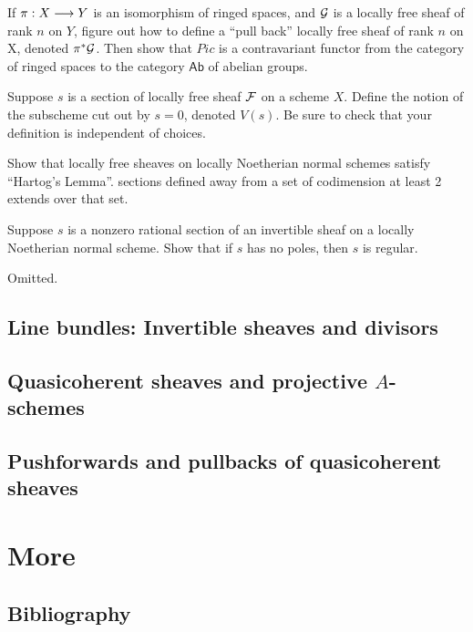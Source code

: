 \documentclass[11pt]{book} %
\begin{document}
\begin{exr}
If $\pi:X\longrightarrow Y$ is an isomorphism of ringed spaces, and ${\cal G}$ is a locally free sheaf of rank $n$ on $Y$, figure out how to define a ``pull back'' locally free sheaf of rank $n$ on X, denoted $\pi^*{\cal G}$. Then show that $Pic$ is a contravariant functor from the category of ringed spaces to the category $\mathsf{Ab}$ of abelian groups.
\end{exr}

\begin{exr}
Suppose $s$ is a section of locally free sheaf ${\cal F}$ on a scheme $X$. Define the notion of the subscheme cut out by $s=0$, denoted $V(s)$. Be sure to check that your definition is independent of choices.
\end{exr}
\begin{exr}
Show that locally free sheaves on locally Noetherian normal schemes satisfy ``Hartog's Lemma''. sections defined away from a set of codimension at least 2 extends over that set. 
\end{exr}

\begin{exr}
Suppose $s$ is a nonzero rational section of an invertible sheaf on a locally Noetherian normal scheme. Show that if $s$ has no poles, then $s$ is regular.
\end{exr}
\begin{exr}
Omitted.
\end{exr}
\chapter{Line bundles: Invertible sheaves and divisors}
\chapter{Quasicoherent sheaves and projective $A$-schemes}
\chapter{Pushforwards and pullbacks of quasicoherent sheaves}
\part{More}


\chapter*{Bibliography}
\end{document}

